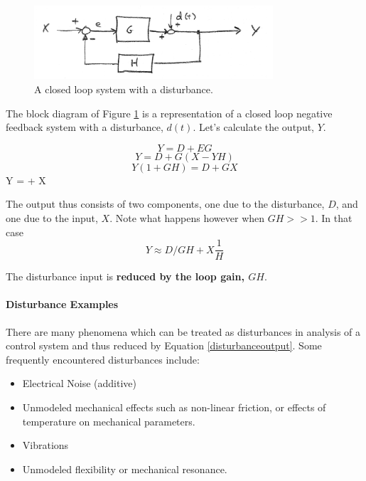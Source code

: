 \begin{figure}\centering
\includegraphics[width=3.5in]{figs06/00773a.png}
\caption{A closed loop system with a disturbance.}\label{DisturbanceLoop}
\end{figure}


The block diagram of Figure \ref{DisturbanceLoop} is a representation of a closed loop negative feedback system with a disturbance, $d(t)$.
Let's calculate the output, $Y$.

\[
Y = D + EG
\]
\[
Y = D+ G(X-YH)
\]
\[
Y(1+GH) = D+GX
\]
\bq\label{disturbanceoutput}
Y =  +  X
\eq

 The output thus consists of two components, one due to the disturbance, $D$, and one due to the input, $X$.   Note what happens however when $GH>>1$. In that case
 \[
 Y \approx D/GH + X \frac{1}{H}
 \]

 The disturbance input is {\bf reduced by the loop gain, $GH$}.

\paragraph{Disturbance Examples}

There are many phenomena which can be treated as disturbances in analysis of a control system and thus reduced by Equation \ref{disturbanceoutput}.
Some frequently encountered disturbances include:


\begin{itemize}
  \item Electrical Noise (additive)
  \item Unmodeled mechanical effects such as non-linear friction, or effects of temperature on mechanical parameters.
  \item Vibrations
  \item Unmodeled flexibility or mechanical resonance.
\end{itemize}



